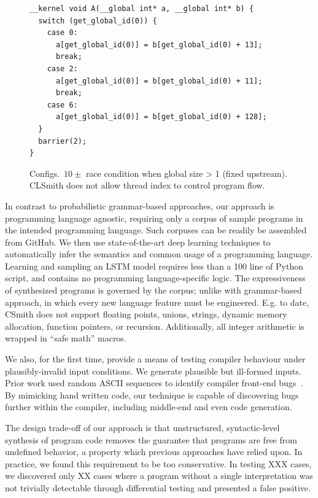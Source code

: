 \begin{figure}
\lstset{language=[OpenCL]C}
\begin{lstlisting}
__kernel void A(__global int* a, __global int* b) {
  switch (get_global_id(0)) {
    case 0:
      a[get_global_id(0)] = b[get_global_id(0) + 13];
      break;
    case 2:
      a[get_global_id(0)] = b[get_global_id(0) + 11];
      break;
    case 6:
      a[get_global_id(0)] = b[get_global_id(0) + 128];
  }
  barrier(2);
}
\end{lstlisting}
\caption{%
	Configs.\ $10\pm$ race condition when global size > 1 (fixed upstream).
	CLSmith does not allow thread index to control program flow.%
}
\label{lst:oclgrind-llvm-densemap-assertion}
\end{figure}


In contrast to probabilistic grammar-based approaches, our approach is programming language agnostic, requiring only a corpus of sample programs in the intended programming language. Such corpuses can be readily be assembled from GitHub. We then use state-of-the-art deep learning techniques to automatically infer the semantics and common usage of a programming language. Learning and sampling an LSTM model requires less than a 100 line of Python script, and contains no programming language-specific logic. The expressiveness of synthesized programs is governed by the corpus; unlike with grammar-based approach, in which every new language feature must be engineered. E.g. to date, CSmith does not support floating points, unions, strings, dynamic memory allocation, function pointers, or recursion. Additionally, all integer arithmetic is wrapped in ``safe math'' macros.

We also, for the first time, provide a means of testing compiler behaviour under plausibly-invalid input conditions. We generate plausible but ill-formed inputs. Prior work used random ASCII sequences to identify compiler front-end bugs~\cite{McKeeman1998}. By mimicking hand written code, our technique is capable of discovering bugs further within the compiler, including middle-end and even code generation.

The design trade-off of our approach is that unstructured, syntactic-level synthesis of program code removes the guarantee that programs are free from undefined behavior, a property which previous approaches have relied upon. In practice, we found this requirement to be too conservative. In testing XXX cases, we discovered only XX cases where a program without a single interpretation was not trivially detectable through differential testing and presented a false positive.

